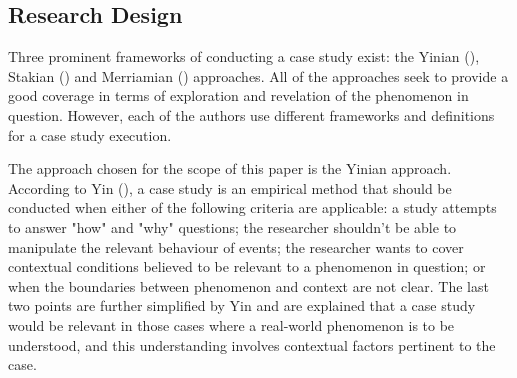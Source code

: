 \documentclass[11pt,a4paper]{article}
\begin{document}
{{%



\subsection{Research Design}
\vspace{-1mm}
\par
Three prominent frameworks of conducting a case study exist: the Yinian (\citeyear{yinCaseStudyResearch2017}), Stakian (\citeyear{stakeArtCaseStudy1995}) and Merriamian (\citeyear{merriamQualitativeResearchCase1998}) approaches. All of the approaches seek to provide a good coverage in terms of exploration and revelation of the phenomenon in question. However, each of the authors use different frameworks and definitions for a case study execution. \par 
The approach chosen for the scope of this paper is the Yinian approach. According to Yin (\citeyear{yinCaseStudyResearch2017}), a case study is an empirical method that should be conducted when either of the following criteria are applicable: a study attempts to answer "how" and "why" questions; the researcher shouldn't be able to manipulate the relevant behaviour of events; the researcher wants to cover contextual conditions believed to be relevant to a phenomenon in question; or when the boundaries between phenomenon and context are not clear. The last two points are further simplified by Yin and are explained that a case study would be relevant in those cases where a real-world phenomenon is to be understood, and this understanding involves contextual factors pertinent to the case. \par
}}
\end{document}
